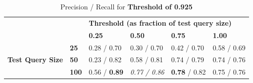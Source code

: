\documentclass[12pt]{IEEEtran}
\begin{document}
\begin{table}[]
\centering
\caption{Precision / Recall for \textbf{Threshold of 0.925}}
\label{t925}
\begin{tabular}{ll|llll}
\cline{3-6}
                                                       &              & \multicolumn{4}{l|}{\textbf{Threshold (as fraction of test query size)}}                                                                          \\ \cline{3-6} 
\textbf{}                                              &              & \multicolumn{1}{l|}{\textbf{0.25}} & \multicolumn{1}{l|}{\textbf{0.50}} & \multicolumn{1}{l|}{\textbf{0.75}} & \multicolumn{1}{l|}{\textbf{1.00}} \\ \hline
\multicolumn{1}{|l|}{\multirow{3}{*}{\textbf{Test Query Size}}} & \textbf{25}  & 0.28 / 0.70                         & 0.30 / 0.70                         & 0.42 / 0.70                        & 0.58 / 0.69                        \\ \cline{2-2}
\multicolumn{1}{|l|}{}                                 & \textbf{50}  & 0.23 / 0.82                        & 0.58 / 0.81                         & 0.74 / 0.79                         & 0.74 / 0.76                        \\ \cline{2-2}
\multicolumn{1}{|l|}{}                                 & \textbf{100} & 0.56 / \textbf{0.89}                          & \emph{0.77 / 0.86}                    & \textbf{0.78} / 0.82                         & 0.75 / 0.76                          \\ \cline{1-2}
\end{tabular}
\end{table}
\end{document}
